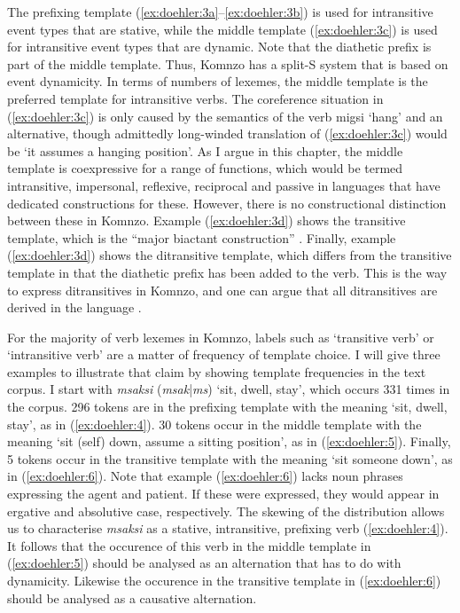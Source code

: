 \documentclass[output=paper]{langscibook}
\begin{document}
The prefixing template (\ref{ex:doehler:3a}--\ref{ex:doehler:3b}) is used for intransitive event types that are stative, while the middle template (\ref{ex:doehler:3c}) is used for intransitive event types that are dynamic. Note that the diathetic prefix is part of the middle template. Thus, Komnzo has a split-S system that is based on event dynamicity. In terms of numbers of lexemes, the middle template is the preferred template for intransitive verbs. The coreference situation in (\ref{ex:doehler:3c}) is only caused by the semantics of the verb {migsi} `hang' and an alternative, though admittedly long-winded translation of (\ref{ex:doehler:3c}) would be `it assumes a hanging position'. As I argue in this chapter, the middle template is coexpressive for a range of functions, which would be termed intransitive, impersonal, reflexive, reciprocal and passive in languages that have dedicated constructions for these. However, there is no constructional distinction between these in Komnzo. Example (\ref{ex:doehler:3d}) shows the transitive template, which is the ``major biactant construction'' \citep{Lazard2002}. Finally, example (\ref{ex:doehler:3d}) shows the ditransitive template, which differs from the transitive template in that the diathetic prefix has been added to the verb. This is the way to express ditransitives in Komnzo, and one can argue that all ditransitives are derived in the language \citep[206]{Doehler2018}.

For the majority of verb lexemes in Komnzo, labels such as `transitive verb' or `intransitive verb' are a matter of frequency of template choice. I will give three examples to illustrate that claim by showing template frequencies in the text corpus. I start with \emph{msaksi} (\emph{msak}|\emph{ms}) `sit, dwell, stay', which occurs 331 times in the corpus. 296 tokens are in the prefixing template with the meaning `sit, dwell, stay', as in (\ref{ex:doehler:4}). 30 tokens occur in the middle template with the meaning `sit (self) down, assume a sitting position', as in (\ref{ex:doehler:5}). Finally, 5 tokens occur in the transitive template with the meaning `sit someone down', as in (\ref{ex:doehler:6}). Note that example (\ref{ex:doehler:6}) lacks noun phrases expressing the agent and patient. If these were expressed, they would appear in ergative and absolutive case, respectively. The skewing of the distribution allows us to characterise \emph{msaksi} as a stative, intransitive, prefixing verb (\ref{ex:doehler:4}). It follows that the occurence of this verb in the middle template in (\ref{ex:doehler:5}) should be analysed as an alternation that has to do with dynamicity. Likewise the occurence in the transitive template in (\ref{ex:doehler:6}) should be analysed as a causative alternation.
\end{document}
